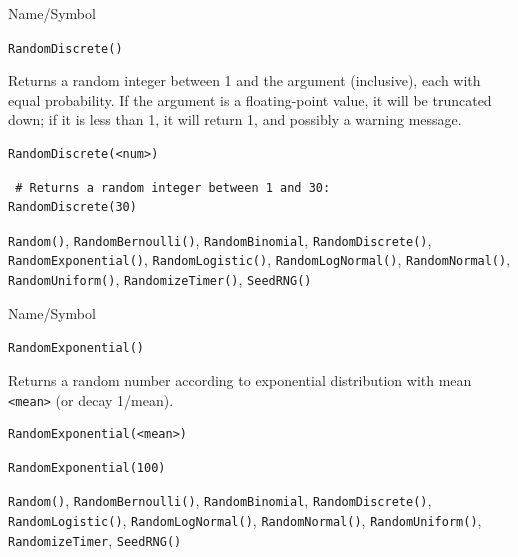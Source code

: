 \begin{desc}{Name/Symbol}
\item[Name/Symbol]	\verb+RandomDiscrete()+

\item[Description]	Returns a random integer between 1 and the argument 
		(inclusive), each with equal probability.  If the argument is 
		a floating-point value, it will be truncated down; if it is 
		less than 1, it will return 1, and possibly a warning message. 

\item[Usage]		
\begin{verbatim}
RandomDiscrete(<num>)
\end{verbatim}
         
\item[Example]	
\begin{verbatim}
 # Returns a random integer between 1 and 30:
RandomDiscrete(30)
\end{verbatim}

\item[See Also]	\verb+Random()+, \verb+RandomBernoulli()+, \verb+RandomBinomial+, 
		\verb+RandomDiscrete()+, \verb+RandomExponential()+, \verb+RandomLogistic()+,
		\verb+RandomLogNormal()+, \verb+RandomNormal()+, \verb+RandomUniform()+,
		\verb+RandomizeTimer()+, \verb+SeedRNG()+    
\end{desc}

\begin{desc}{Name/Symbol}
\item[Name/Symbol]	\verb+RandomExponential()+

\item[Description]	Returns a random number according to exponential 
		distribution with mean \verb+<mean>+ (or decay 1/mean).

\item[Usage]		
\begin{verbatim}
RandomExponential(<mean>)
\end{verbatim}

\item[Example]	
\begin{verbatim}
RandomExponential(100)
\end{verbatim}

\item[See Also]	\verb+Random()+, \verb+RandomBernoulli()+, \verb+RandomBinomial+,
		\verb+RandomDiscrete()+, \verb+RandomLogistic()+, \verb+RandomLogNormal()+, 
		\verb+RandomNormal()+, \verb+RandomUniform()+, \verb+RandomizeTimer+, \verb+SeedRNG()+
\end{desc}




